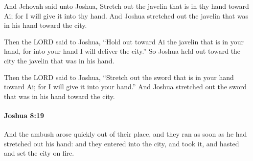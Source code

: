 			\begin{versebox}
					\item[BHS] 
					\item[ASV] And Jehovah said unto Joshua, Stretch out the javelin that is in thy hand toward Ai; for I will give it into thy hand. And Joshua stretched out the javelin that was in his hand toward the city.
					\item[NIV] Then the LORD said to Joshua, “Hold out toward Ai the javelin that is in your hand, for into your hand I will deliver the city.” So Joshua held out toward the city the javelin that was in his hand.
					\item[NRSV] Then the LORD said to Joshua, “Stretch out the sword that is in your hand toward Ai; for I will give it into your hand.” And Joshua stretched out the sword that was in his hand toward the city.
			\end{versebox}

		\paragraph{Joshua 8:19} %
			\label{JOSHUA-8-19}

			And the ambush arose quickly out of their place, and they ran as soon as he had stretched out his hand: and they entered into the city, and took it, and hasted and set the city on fire.

